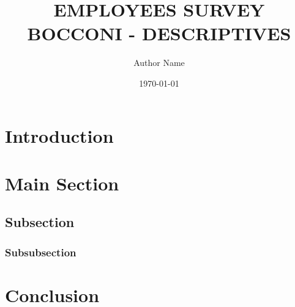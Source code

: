 \documentclass[12pt]{article}
\title{EMPLOYEES SURVEY BOCCONI - DESCRIPTIVES}
\author{Author Name}
\date{\today}
\numberwithin{figure}{section}
\numberwithin{table}{section}
\begin{document}
\maketitle


\section{Introduction}
\blindtext

\section{Main Section}
\subsection{Subsection}
\blindtext

\subsubsection{Subsubsection}
\blindtext

\section{Conclusion}
\blindtext

\end{document}
